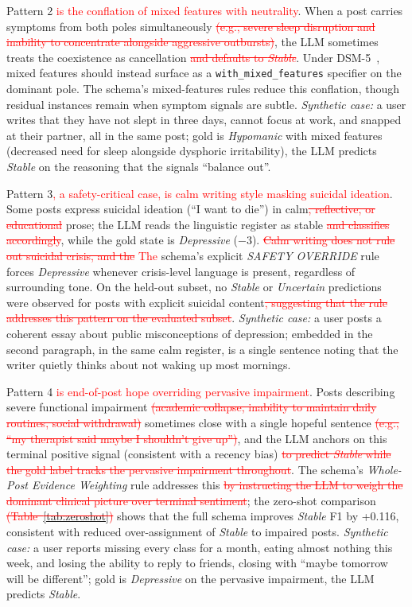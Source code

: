 \documentclass[runningheads]{llncs}
\newcommand{\rev}[1]{\textcolor{red}{#1}}
\newcommand{\del}[1]{\textcolor{red}{\sout{#1}}}
\newcommand{\rev}[1]{#1}
\newcommand{\del}[1]{}
\begin{document}
Pattern 2 \rev{is the conflation of mixed features with neutrality}. When a post carries symptoms from both poles simultaneously\del{ (e.g., severe sleep disruption and inability to concentrate alongside aggressive outbursts)}, the LLM sometimes treats the coexistence as cancellation\del{ and defaults to \emph{Stable}}. Under DSM-5~\cite{apa2013dsm5}, mixed features should instead surface as a \texttt{with\_mixed\_features} specifier on the dominant pole. The schema's mixed-features rules reduce this conflation, though residual instances remain when symptom signals are subtle. \emph{Synthetic case:} a user writes that they have not slept in three days, cannot focus at work, and snapped at their partner, all in the same post; gold is \emph{Hypomanic} with mixed features (decreased need for sleep alongside dysphoric irritability), the LLM predicts \emph{Stable} on the reasoning that the signals ``balance out''.

Pattern 3\rev{, a safety-critical case, is calm writing style masking suicidal ideation}. Some posts express suicidal ideation (``I want to die'') in calm\del{, reflective, or educational} prose; the LLM reads the linguistic register as stable\del{ and classifies accordingly}, while the gold state is \emph{Depressive} ($-3$). \del{Calm writing does not rule out suicidal crisis, and the} \rev{The} schema's explicit \emph{SAFETY OVERRIDE} rule forces \emph{Depressive} whenever crisis-level language is present, regardless of surrounding tone. On the held-out subset, no \emph{Stable} or \emph{Uncertain} predictions were observed for posts with explicit suicidal content\del{, suggesting that the rule addresses this pattern on the evaluated subset}. \emph{Synthetic case:} a user posts a coherent essay about public misconceptions of depression; embedded in the second paragraph, in the same calm register, is a single sentence noting that the writer quietly thinks about not waking up most mornings.

Pattern 4 \rev{is end-of-post hope overriding pervasive impairment}. Posts describing severe functional impairment\del{ (academic collapse, inability to maintain daily routines, social withdrawal)} sometimes close with a single hopeful sentence\del{ (e.g., ``my therapist said maybe I shouldn't give up'')}, and the LLM anchors on this terminal positive signal (consistent with a recency bias)\del{ to predict \emph{Stable} while the gold label tracks the pervasive impairment throughout}. The schema's \emph{Whole-Post Evidence Weighting} rule addresses this\del{ by instructing the LLM to weigh the dominant clinical picture over terminal sentiment}; the zero-shot comparison \del{(Table~\ref{tab:zeroshot}) }shows that the full schema improves \emph{Stable} F1 by +0.116, consistent with reduced over-assignment of \emph{Stable} to impaired posts. \emph{Synthetic case:} a user reports missing every class for a month, eating almost nothing this week, and losing the ability to reply to friends, closing with ``maybe tomorrow will be different''; gold is \emph{Depressive} on the pervasive impairment, the LLM predicts \emph{Stable}.
\end{document}
